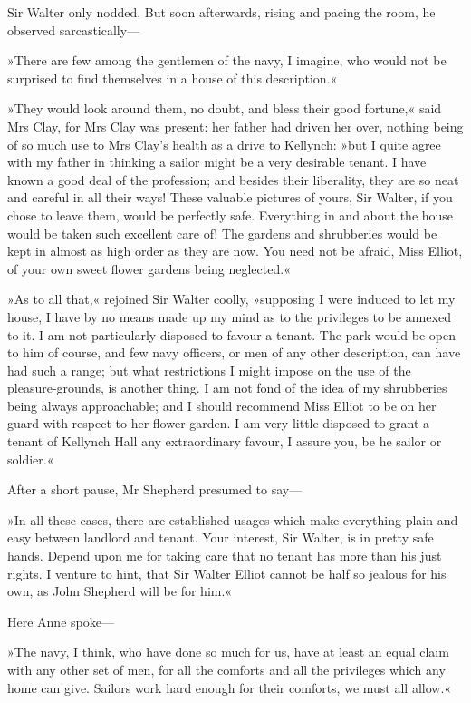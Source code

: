 Sir Walter only nodded. But soon afterwards, rising and pacing the room, he observed sarcastically—

»There are few among the gentlemen of the navy, I imagine, who would not be surprised to find themselves in a house of this description.«

»They would look around them, no doubt, and bless their good fortune,« said Mrs Clay, for Mrs Clay was present: her father had driven her over, nothing being of so much use to Mrs Clay's health as a drive to Kellynch: »but I quite agree with my father in thinking a sailor might be a very desirable tenant. I have known a good deal of the profession; and besides their liberality, they are so neat and careful in all their ways! These valuable pictures of yours, Sir Walter, if you chose to leave them, would be perfectly safe. Everything in and about the house would be taken such excellent care of! The gardens and shrubberies would be kept in almost as high order as they are now. You need not be afraid, Miss Elliot, of your own sweet flower gardens being neglected.«

»As to all that,« rejoined Sir Walter coolly, »supposing I were induced to let my house, I have by no means made up my mind as to the privileges to be annexed to it. I am not particularly disposed to favour a tenant. The park would be open to him of course, and few navy officers, or men of any other description, can have had such a range; but what restrictions I might impose on the use of the pleasure-grounds, is another thing. I am not fond of the idea of my shrubberies being always approachable; and I should recommend Miss Elliot to be on her guard with respect to her flower garden. I am very little disposed to grant a tenant of Kellynch Hall any extraordinary favour, I assure you, be he sailor or soldier.«

After a short pause, Mr Shepherd presumed to say—

»In all these cases, there are established usages which make everything plain and easy between landlord and tenant. Your interest, Sir Walter, is in pretty safe hands. Depend upon me for taking care that no tenant has more than his just rights. I venture to hint, that Sir Walter Elliot cannot be half so jealous for his own, as John Shepherd will be for him.«

Here Anne spoke—

»The navy, I think, who have done so much for us, have at least an equal claim with any other set of men, for all the comforts and all the privileges which any home can give. Sailors work hard enough for their comforts, we must all allow.«

